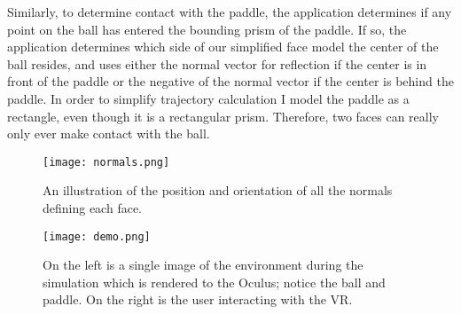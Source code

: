 Similarly, to determine contact with the paddle, the application determines if
any point on the ball has entered the bounding prism of the paddle. If so, the
application determines which side of our simplified face model the center of
the ball resides, and uses either the normal vector for reflection if the
center is in front of the paddle or the negative of the normal vector if the
center is behind the paddle.  In order to simplify trajectory calculation I
model the paddle as a rectangle, even though it is a rectangular prism.
Therefore, two faces can really only ever make contact with the ball. 

\begin{figure}[]
\centering
\texttt{[image: normals.png]}
\caption{An illustration of the position and orientation of all the 
normals defining each face.}
\label{fig:normals}
\end{figure}

\begin{figure}[]
\centering
\texttt{[image: demo.png]}
\caption{On the left is a single image of the environment during the simulation
which is rendered to the Oculus; notice the ball and paddle.  On the right is
the user interacting with the VR.}
\label{fig:demo}
\end{figure}
